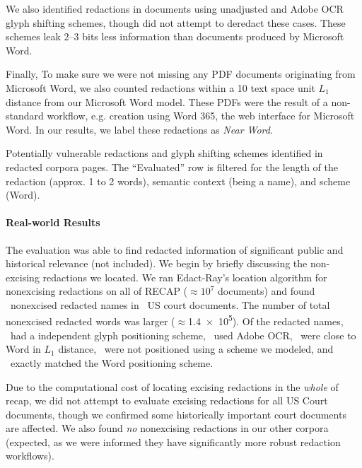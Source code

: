 We also identified redactions in documents using unadjusted and Adobe OCR glyph shifting schemes, though did not attempt to deredact these cases.
These schemes leak 2--3 bits less information than documents produced by Microsoft Word.

Finally, To make sure we were not missing any PDF documents originating from Microsoft Word, we also counted redactions within a 10 text space unit $L_{1}$ distance from our Microsoft Word model.
These PDFs were the result of a non-standard workflow, e.g. creation using Word 365, the web interface for Microsoft Word.
In our results, we label these redactions as \emph{Near Word}.

\begin{table}
  \centering
	\caption{Potentially vulnerable redactions and glyph shifting schemes identified in redacted corpora pages. The ``Evaluated'' row is filtered for the length of the redaction (approx. 1 to 2 words), semantic context (being a name), and scheme (Word).}
\label{tab:wildres}
\small
\end{table}


\paragraph{Real-world Results}
\label{sec:wildres}
The evaluation was able to find redacted information of significant public and historical relevance (not included).
We begin by briefly discussing the non-excising redactions we located.
We ran Edact-Ray's location algorithm for nonexcising redactions on all of RECAP ($\approx10^{7}$ documents) and found \numRECAPNameredactions\ nonexcised redacted names in \numRECAPredactionDocs\ US court documents. 
The number of total nonexcised redacted words was larger ($\approx$\num{1.4e5}).
Of the redacted names, \numRECAPnadj\ had a independent glyph positioning scheme, \numRECAPocr\ used Adobe OCR, \numRECAPNearMSW\ were close to Word in $L_{1}$ distance, \numRECAPunk\ were not positioned using a scheme we modeled, and \numRECAPmsw\ exactly matched the Word positioning scheme.

Due to the computational cost of locating excising redactions in the \emph{whole} of recap, we did not attempt to evaluate excising redactions for all US Court documents, though we confirmed some historically important court documents are affected.
We also found \emph{no} nonexcising redactions in our other corpora (expected, as we were informed they have significantly more robust redaction workflows).

